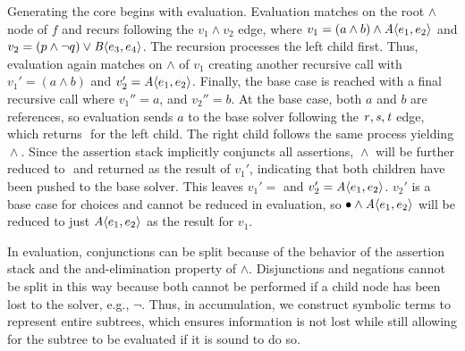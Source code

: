 Generating the core begins with evaluation. Evaluation matches on the root
$\wedge$ node of $f$ and recurs following the $v_1 \wedge v_2$ edge, where
%
$v_1=(a\wedge b)\wedge\chc[A]{e_1,e_2}$ and
$v_2=(p\wedge \neg q) \vee \chc[B]{e_3, e_4}$.
%
The recursion processes the left child first. Thus, evaluation again matches on
$\wedge$ of $v_{1}$ creating another recursive call with $v_{1}' = (a\wedge b)$
and $v_{2}' = \chc[A]{e_1,e_2}$. Finally, the base case is reached with a final
recursive call where $v_{1}'' = a$, and $v_{2}'' = b$. At the base case, both
$a$ and $b$ are references, so evaluation sends $a$ to the base solver
following the $\mathit{r, s, t}$ edge, which returns $\unit{}$ for the left child.
The right child follows the same process yielding $\unit{} \wedge \unit{}$.
Since the assertion stack implicitly conjuncts all assertions, $\unit{} \wedge
\unit{}$ will be further reduced to $\unit{}$ and returned as the result of
$v_{1}'$, indicating that both children have been pushed to the base solver.
This leaves $v_{1}' = \unit{}$ and $v_{2}' = \chc[A]{e_1,e_2}$. $v_{2}'$ is a
base case for choices and cannot be reduced in evaluation, so $\unit{} \wedge
\chc[A]{e_1,e_2}$ will be reduced to just $\chc[A]{e_1,e_2}$ as the result for
$v_{1}$.

In evaluation, conjunctions can be split because of the behavior of the
assertion stack and the and-elimination property of $\wedge$. Disjunctions and
negations cannot be split in this way because both cannot be performed if a
child node has been lost to the solver, e.g., $\neg \unit{}$. Thus, in
accumulation, we construct symbolic terms to represent entire subtrees, which
ensures information is not lost while still allowing for the subtree to be
evaluated if it is sound to do so.


